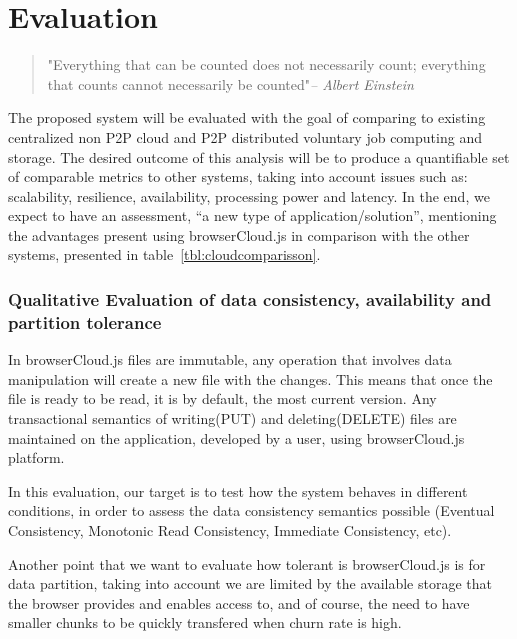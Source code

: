 

\chapter{Evaluation}
\label{ch:evaluation}

\begin{quotation}
  {\small\it }"Everything that can be counted does not necessarily count; everything that counts cannot necessarily be counted"{\small\it -- Albert Einstein }
\end{quotation}

The proposed system will be evaluated with the goal of comparing to existing centralized non P2P cloud and P2P distributed voluntary job computing and storage. The desired outcome of this analysis will be to produce a quantifiable set of comparable metrics to other systems, taking into account issues such as: scalability, resilience, availability, processing power and latency. In the end, we expect to have an assessment, ``a new type of application/solution'', mentioning the advantages present using browserCloud.js in comparison with the other systems, presented in table~\ref{tbl:cloudcomparisson}.


\subsection{Qualitative Evaluation of data consistency, availability and partition tolerance}

In browserCloud.js files are immutable, any operation that involves data manipulation will create a new file with the changes. This means that once the file is ready to be read, it is by default, the most current version. Any transactional semantics of writing(PUT) and deleting(DELETE) files are maintained on the application, developed by a user, using browserCloud.js platform. 

In this evaluation, our target is to test how the system behaves in different conditions, in order to assess the data consistency semantics possible (Eventual Consistency, Monotonic Read Consistency, Immediate Consistency, etc).

Another point that we want to evaluate how tolerant is browserCloud.js is for data partition, taking into account we are limited by the available storage that the browser provides and enables access to, and of course, the need to have smaller chunks to be quickly transfered when churn rate is high.

